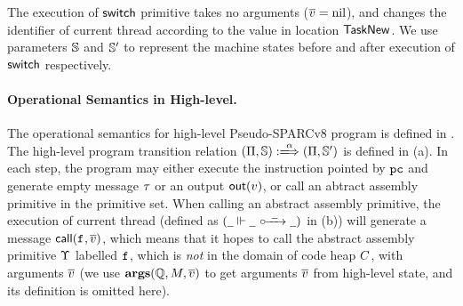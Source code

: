 The execution of $\mathsf{switch}{}$ primitive takes no arguments
($\overline{v} = \text{nil}$), and changes the identifier
of current thread according to the value
in location $\mathsf{TaskNew}$. We use parameters $\mathbb{S}$
and $\mathbb{S}'$ to represent the machine states before
and after execution of $\mathsf{switch}{}$ respectively.

\paragraph{\textbf{Operational Semantics in High-level.}}
The operational semantics for high-level Pseudo-SPARCv8 program
is defined in \Fig{\ref{fig:selected-opsem-high-level-prog}}.
The high-level program transition relation
$\HGlobTrans{(\HMd, \hpstate)}{\hmsg}{(\HMd, \hpstate')}$ is defined
in \Fig{\ref{fig:selected-opsem-high-level-prog}} (a). In each step,
the program may either execute the instruction pointed by $\texttt{pc}$
and generate empty message $\tau$ or an output $\textsf{out}({v})$,
or call  an abtract assembly primitive in the primitive set.
When calling an abstract assembly primitive,
the execution of current thread (defined as
$(\hlocalstep{\notCare}{\notCare}{\ \notCare \ }{\notCare})$ in
\Fig{\ref{fig:selected-opsem-high-level-prog}} (b)) will generate
a message $\textsf{call}({\texttt{f}_{}, \overline{v}})$, which means that it
hopes to call the abstract assembly primitive $\Upsilon$ labelled
$\texttt{f}_{}$, which is {\it not} in the domain of code heap $C$,
with arguments $\overline{v}$
(we use $\textbf{args}(\mathbb{Q}, M, \overline{v})$
to get arguments $\overline{v}$
from high-level state, and its definition is omitted here).

